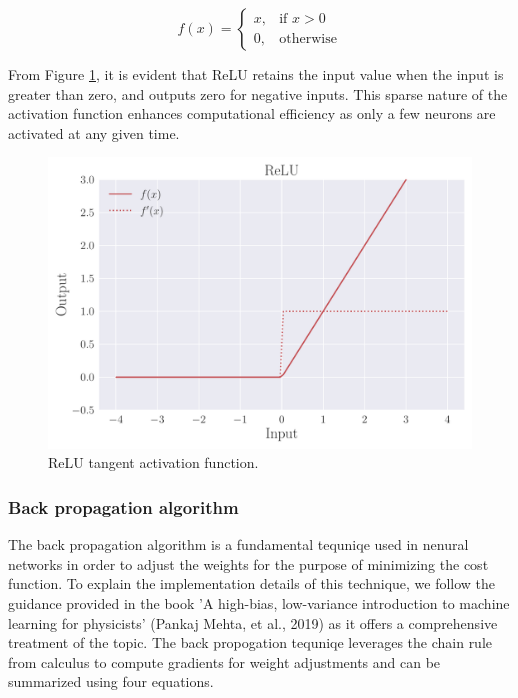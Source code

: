 \documentclass[a4paper, UKenglish, 11pt]{uiomaster}
\begin{document}
\begin{equation}
    f(x) = \begin{cases}
        x, & \text{if } x > 0 \\
        0, & \text{otherwise}
    \end{cases}
\label{eq:ReLU}
\end{equation}

From Figure \ref{fig:ReLU}, it is evident that ReLU retains the input value when the input is greater than zero, and outputs zero for negative inputs. This sparse nature of the activation function enhances computational efficiency as only a few neurons are activated at any given time.


\begin{figure}
    \centering
    \includegraphics[width=\linewidth]{figures/ReLU.pdf}
    \caption{ReLU tangent activation function.}
    \label{fig:ReLU}
\end{figure}


\subsubsection{Back propagation algorithm}
The back propagation algorithm is a fundamental tequniqe used in nenural networks in order to adjust the weights for the purpose of minimizing the cost function. To explain the implementation details of this technique, we follow the guidance provided in the book 'A high-bias, low-variance introduction to machine learning for physicists' (Pankaj Mehta, et al., 2019) as it offers a comprehensive treatment of the topic. The back propogation tequniqe leverages the chain rule from calculus to compute gradients for weight adjustments and can be summarized using four equations.
\end{document}
